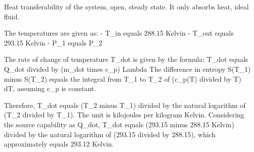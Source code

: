 Heat transferability of the system, open, steady state. It only absorbs heat, ideal fluid.

The temperatures are given as:
- T_in equals 288.15 Kelvin
- T_out equals 293.15 Kelvin
- P_1 equals P_2

The rate of change of temperature T_dot is given by the formula:
T_dot equals Q_dot divided by (m_dot times c_p)
Lambda
The difference in entropy S(T_1) minus S(T_2) equals the integral from T_1 to T_2 of (c_p(T) divided by T) dT, assuming c_p is constant.

Therefore, T_dot equals (T_2 minus T_1) divided by the natural logarithm of (T_2 divided by T_1). The unit is kilojoules per kilogram Kelvin.
Considering the source capability as Q_dot, T_dot equals (293.15 minus 288.15 Kelvin) divided by the natural logarithm of (293.15 divided by 288.15), which approximately equals 293.12 Kelvin.